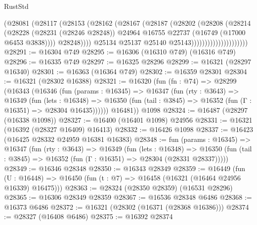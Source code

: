\begin{lexlean}{RustStd}
\begin{coremodule}
                                      (@28081
                                        (@28117
                                          (@28153
                                            (@28162
                                              (@28167
                                                (@28187
                                                  (@28202
                                                    (@28208
                                                      (@28214
                                                        (@28228
                                                          (@28231 (@28246 @28248))
                                                          @24964
                                                          @16755
                                                          @22737
                                                          (@16749 (@17000 @6453 @3838))))
                                                      @28248))))
                                              @25134
                                              @25137
                                              @25140
                                              @25143)))))))))))))))))))))
@28291 := @16304 @749
@28295 := @16306 (@16310 @749) (@16316 @749)
@28296 := @16335 @749
@28297 := @16325 @28296
@28299 := @16321 (@28297 @16340)
@28301 := @16363 (@16364 @749)
@28302 := @16359 @28301
@28304 := @16321 (@28302 @16388)
@28321 := @16320
    (fun (fn : @74) =>
    @28299
      (@16343
        (@16346
          (fun (params : @16345) =>
          @16347
            (fun (rty : @3643) =>
            @16349
              (fun (lets : @16348) =>
              @16350 (fun (tail : @3845) => @16352 (fun (Γ : @16351) => @28304 @16435))))))
        @16481))
    @1098
@28324 := @16487 (@28297 (@16338 @1098))
@28327 := @16400 (@16401 @1098) @24956
@28331 := @16321 (@16392 (@28327 @16409) @16413)
@28332 := @16426 @1098
@28337 := @16423 (@16425 @28332 @24959 @16381 @16383)
@28348 := fun (params : @16345) =>
  @16347
    (fun (rty : @3643) =>
    @16349
      (fun (lets : @16348) =>
      @16350 (fun (tail : @3845) => @16352 (fun (Γ : @16351) => @28304 (@28331 @28337)))))
@28349 := @16346 @28348
@28350 := @16343 @28349
@28359 := @16449
    (fun (U : @16448) => @16450 (fun (t : @7) => @16458 (@16321 (@16464 @24956 @16339) @16475)))
@28363 := @28324 (@28350 @28359) (@16531 @28296)
@28365 := @16306 @28349 @28359
@28367 := @16536 @28348 @6486
@28368 := @16373 @6486
@28372 := @16321 (@28302 (@16371 (@28368 @16386)))
@28374 := @28327 (@16408 @6486)
@28375 := @16392 @28374

\end{coremodule}
\end{lexlean}
